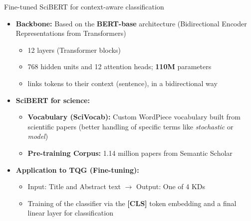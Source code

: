 \documentclass{beamer}
\begin{document}
\begin{frame}{Fine-tuned SciBERT for context-aware classification}
    \begin{itemize}
        \item \textbf{Backbone:} Based on the \textbf{BERT-base} architecture (Bidirectional Encoder Representations from Transformers)
        \begin{itemize}
            \item 12 layers (Transformer blocks)
            \item 768 hidden units and 12 attention heads; \textbf{110M} parameters
            \item links tokens to their context (sentence), in a bidirectional way
        \end{itemize}
        \item \textbf{SciBERT for science: \cite{beltagy2019scibert}}
        \begin{itemize}
            \item \textbf{Vocabulary (SciVocab):} Custom WordPiece vocabulary built from scientific papers (better handling of specific terms like \textit{stochastic} or \textit{model})
            \item \textbf{Pre-training Corpus:} 1.14 million papers from Semantic Scholar
        \end{itemize}
        \item \textbf{Application to TQG (Fine-tuning):}
        \begin{itemize}
            \item Input: Title and Abstract text $\rightarrow$ Output: One of 4 KDs
            \item Training of the classifier via the \textbf{[CLS]} token embedding and a final linear layer for classification
        \end{itemize}
    \end{itemize}
\end{frame}
\end{document}
